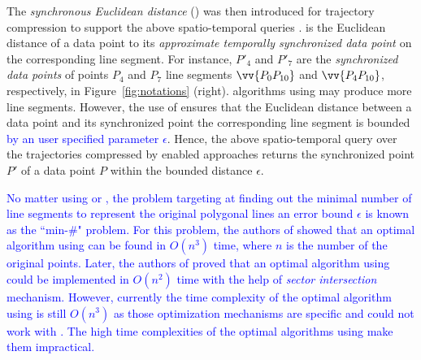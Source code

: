 

The \emph{synchronous Euclidean distance} (\sed) was then introduced for trajectory compression to support the above spatio-temporal queries \cite{Meratnia:Spatiotemporal}. \sed is the Euclidean distance of a data point to its \emph{approximate temporally synchronized data point \cite{Meratnia:Spatiotemporal}} on the corresponding line segment. For instance, $P'_4$ and $P'_7$ are the \emph{synchronized data points} of points $P_4$ and $P_7$ \wrt line segments $\vv{P_0P_{10}}$ and $\vv{P_4P_{10}}$, respectively, in Figure~\ref{fig:notations} (right).
\lsa algorithms using \sed may produce more line segments. However, the use of \sed ensures that the Euclidean distance between a data point and its  synchronized point \wrt the corresponding line segment is bounded \textcolor{blue}{by an user specified parameter $\epsilon$}. Hence, the above spatio-temporal query over the trajectories compressed by \sed enabled approaches returns the synchronized point $P'$ of a data point $P$ within the bounded distance $\epsilon$.


\textcolor{blue}{No matter using \ped or \sed, the problem targeting at finding out the minimal number of line segments to represent the original polygonal lines \wrt an error bound $\epsilon$ is known as the ``min-\#" problem\cite{Imai:Optimal,Chan:Optimal}. For this problem, 
	the authors of \cite{Imai:Optimal} showed that an optimal \lsa algorithm using \ped can be found in $O(n^3)$ time, where $n$ is the number of the original points. 
	Later, the authors of \cite{Chan:Optimal} proved that an optimal algorithm using \ped could be implemented in $O(n^2)$ time with the help of \textit{sector intersection} mechanism. 
	However, currently the time complexity of the optimal \lsa algorithm using \sed is still $O(n^3)$ as those optimization mechanisms are \ped specific and could not work with \sed.
	The high time complexities of the optimal \lsa algorithms using \sed make them impractical.}



